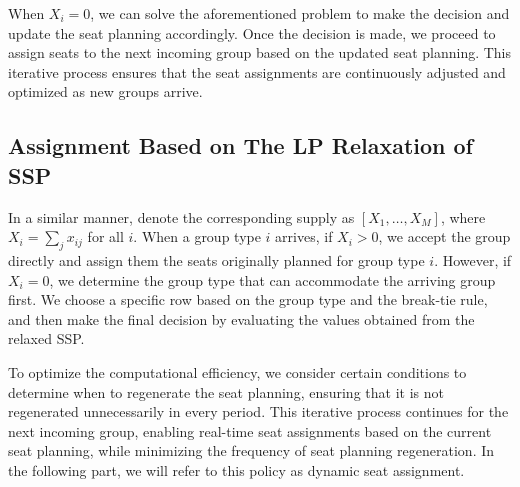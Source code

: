 When $X_i = 0$, we can solve the aforementioned problem to make the decision and update the seat planning accordingly. Once the decision is made, we proceed to assign seats to the next incoming group based on the updated seat planning. This iterative process ensures that the seat assignments are continuously adjusted and optimized as new groups arrive.


\subsection{Assignment Based on The LP Relaxation of SSP}
In a similar manner, denote the corresponding supply as $[X_1, \ldots, X_M]$, where $X_i = \sum_{j} x_{ij}$ for all $i$. When a group type $i$ arrives, if $X_i > 0$, we accept the group directly and assign them the seats originally planned for group type $i$. However, if $X_i = 0$, we determine the group type that can accommodate the arriving group first. We choose a specific row based on the group type and the break-tie rule, and then make the final decision by evaluating the values obtained from the relaxed SSP.

To optimize the computational efficiency, we consider certain conditions to determine when to regenerate the seat planning, ensuring that it is not regenerated unnecessarily in every period. This iterative process continues for the next incoming group, enabling real-time seat assignments based on the current seat planning, while minimizing the frequency of seat planning regeneration. In the following part, we will refer to this policy as dynamic seat assignment.




